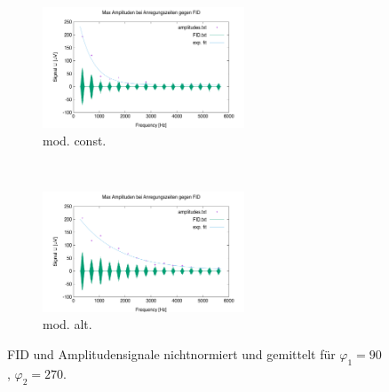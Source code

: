 \documentclass{article}
\begin{document}
        \begin{figure}[H]
            \centering
            \begin{subfigure}[b]{0.4\textwidth}
                \centering
                \includegraphics[width=6cm]{../Bilddateien/10/CPMG-90-270-constant-avg.png}
                \caption{mod. const.}
                \label{fig:CPMG-90-270-constant-avg}
            \end{subfigure}
            \
            \begin{subfigure}[b]{0.4\textwidth}
                \centering
                \includegraphics[width=6cm]{../Bilddateien/10/CPMG-90-270-alternating-avg.png}
                \caption{mod. alt.}
                \label{fig:CPMG-90-270-alternating-avg}
            \end{subfigure}
            \caption{FID und Amplitudensignale nichtnormiert und gemittelt für $\varphi_1 = 90$, $\varphi_2 = 270$.}
            \label{fig:CPMG-90-270-avg}
        \end{figure}
        

\end{document}
